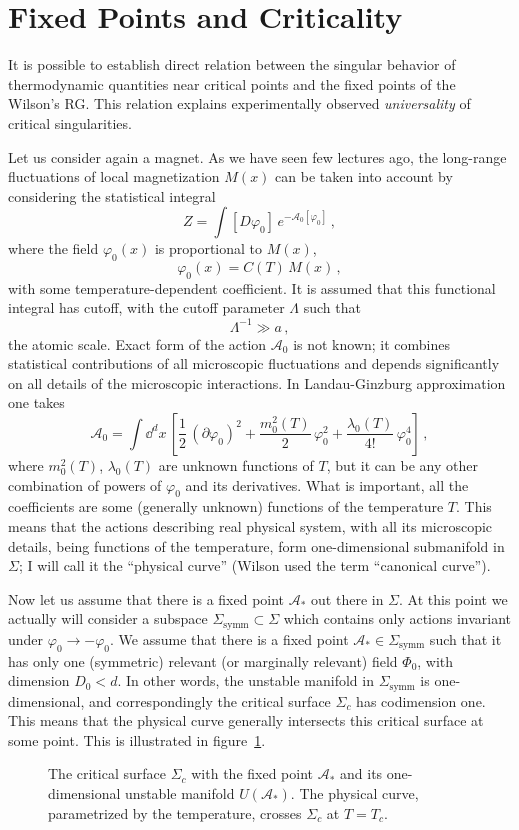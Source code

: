 \section{Fixed Points and Criticality}

It is possible to establish direct relation between the singular behavior of
thermodynamic quantities near critical points and the fixed points of the
Wilson's RG. This relation explains experimentally observed \emph{universality}
of critical singularities.

Let us consider again a magnet. As we have seen few lectures ago, the long-range
fluctuations of local magnetization $M(x)$ can be taken into account by
considering the statistical integral
\[
Z=\int[D\varphi_0]\,e^{-\mathcal A_0[\varphi_0]}\,,
\]
where the field $\varphi_0(x)$ is proportional to $M(x)$,
\[
\varphi_0(x)=C(T)\,M(x)\,,
\]
with some temperature-dependent coefficient. It is assumed that this functional
integral has cutoff, with the cutoff parameter $\Lambda$ such that
\[
\Lambda^{-1}\gg a\,,
\]
the atomic scale. Exact form of the action $\mathcal A_0$ is not known; it
combines statistical contributions of all microscopic fluctuations and depends
significantly on all details of the microscopic interactions. In Landau-Ginzburg
approximation one takes
\[
\mathcal A_0=\int \dd^dx\,\left[\frac12\,(\partial\varphi_0)^2+\frac{m_0^2(T)}2\,\varphi_0^2+\frac{\lambda_0(T)}{4!}\,\varphi_0^4\right]\,,
\]
where $m_0^2(T)$, $\lambda_0(T)$ are unknown functions of $T$, but it can be any
other combination of powers of $\varphi_0$ and its derivatives. What is important,
all the coefficients are some (generally unknown) functions of the temperature
$T$. This means that the actions describing real physical system, with all its
microscopic details, being functions of the temperature, form one-dimensional
submanifold in $\Sigma$; I will call it the ``physical curve'' (Wilson used the
term ``canonical curve'').

Now let us assume that there is a fixed point $\mathcal A_*$ out there in
$\Sigma$. At this point we actually will consider a subspace
$\Sigma_{\text{symm}}\subset\Sigma$ which contains only actions invariant under
$\varphi_0\to-\varphi_0$. We assume that there is a fixed point
$\mathcal A_*\in\Sigma_{\text{symm}}$ such that it has only one (symmetric)
relevant (or marginally relevant) field $\Phi_0$, with dimension $D_0<d$. In
other words, the unstable manifold in $\Sigma_{\text{symm}}$ is one-dimensional,
and correspondingly the critical surface $\Sigma_c$ has codimension one. This
means that the physical curve generally intersects this critical surface at some
point. This is illustrated in figure~\ref{fig:physcurve}.
\begin{figure}[ht]
\centering{}
\caption{The critical surface $\Sigma_c$ with the fixed point $\mathcal A_*$ and
its one-dimensional unstable manifold $U(\mathcal A_*)$. The physical curve,
parametrized by the temperature, crosses $\Sigma_c$ at $T=T_c$.}
\label{fig:physcurve}
\end{figure}

